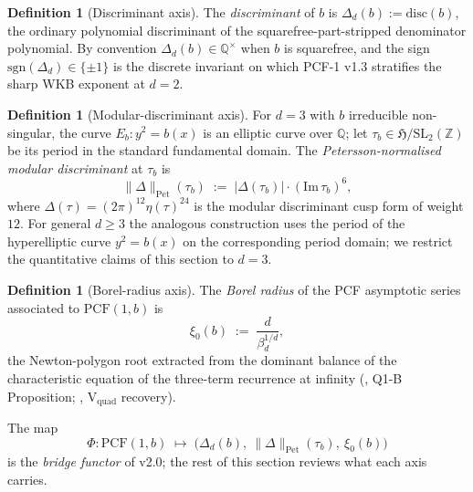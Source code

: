 \documentclass[11pt,a4paper]{article}
\theoremstyle{definition}
\newtheorem{definition}[conjecture]{Definition}
\theoremstyle{remark}
\newcommand{\PCF}{\mathrm{PCF}}
\newcommand{\Q}{\mathbb{Q}}
\newcommand{\Z}{\mathbb{Z}}
\newcommand{\HH}{\mathfrak{H}}
\newcommand{\PetN}[1]{\lVert #1 \rVert_{\mathrm{Pet}}}
\begin{document}
\begin{definition}[Discriminant axis]
\label{def:disc-axis}
The \emph{discriminant} of $b$ is $\Delta_d(b) := \mathrm{disc}(b)$, the
ordinary polynomial discriminant of the squarefree-part-stripped
denominator polynomial. By convention $\Delta_d(b) \in \Q^\times$ when
$b$ is squarefree, and the sign $\mathrm{sgn}(\Delta_d) \in \{\pm 1\}$
is the discrete invariant on which PCF-1 v1.3 stratifies the sharp
WKB exponent at $d=2$.
\end{definition}

\begin{definition}[Modular-discriminant axis]
\label{def:moddisc-axis}
For $d=3$ with $b$ irreducible non-singular, the curve $E_b: y^2 = b(x)$
is an elliptic curve over $\Q$; let $\tau_b \in \HH/\mathrm{SL}_2(\Z)$
be its period in the standard fundamental domain. The
\emph{Petersson-normalised modular discriminant} at $\tau_b$ is
\begin{equation}
  \label{eq:petersson-norm}
  \PetN{\Delta}(\tau_b) \;:=\; |\Delta(\tau_b)| \cdot (\mathrm{Im}\,\tau_b)^{6},
\end{equation}
where $\Delta(\tau) = (2\pi)^{12} \eta(\tau)^{24}$ is the modular
discriminant cusp form of weight $12$. For general $d \geq 3$ the
analogous construction uses the period of the hyperelliptic curve
$y^2 = b(x)$ on the corresponding period domain; we restrict the
quantitative claims of this section to $d=3$.
\end{definition}

\begin{definition}[Borel-radius axis]
\label{def:borel-axis}
The \emph{Borel radius} of the PCF asymptotic series associated to
$\PCF(1,b)$ is
\begin{equation}
  \label{eq:borel-radius}
  \xi_0(b) \;:=\; \frac{d}{\beta_d^{1/d}},
\end{equation}
the Newton-polygon root extracted from the dominant balance of the
characteristic equation of the three-term recurrence at infinity
(\cite{PCF2}, Q1-B Proposition; \cite{CT}, V$_{\mathrm{quad}}$
recovery).
\end{definition}

The map
\begin{equation}
  \label{eq:Phi-functor}
  \Phi : \PCF(1,b) \;\longmapsto\; \bigl(\Delta_d(b),\ \PetN{\Delta}(\tau_b),\ \xi_0(b)\bigr)
\end{equation}
is the \emph{bridge functor} of v2.0; the rest of this section reviews
what each axis carries.
\end{document}
